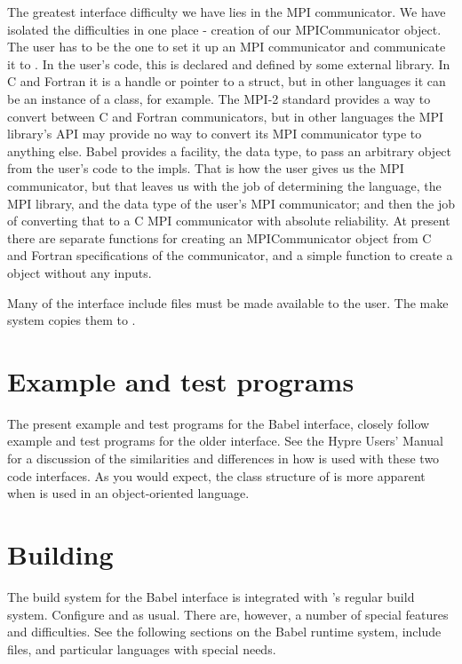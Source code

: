 The greatest interface difficulty we have lies in the MPI
communicator.  We have isolated the difficulties in one place -
creation of our MPICommunicator object.  The user has to be the one to
set it up an MPI communicator and communicate it to \hypre{}.  In the
user's code, this is declared and defined by some external library.
In C and Fortran it is a handle or pointer to a struct, but in other
languages it can be an instance of a class, for example.  The MPI-2
standard provides a way to convert between C and Fortran
communicators, but in other languages the MPI library's API may
provide no way to convert its MPI communicator type to anything else.
Babel provides a facility, the  data type, to pass an
arbitrary object from the user's code to the impls.  That is how the
user gives us the MPI communicator, but that leaves us with the job of
determining the language, the MPI library, and the data type of the
user's MPI communicator; and then the job of converting that to a C
MPI communicator with absolute reliability.  At present there are
separate functions for creating an MPICommunicator object from C and
Fortran specifications of the communicator, and a simple function to
create a  object without any inputs.

Many of the \hypre{} interface include files must be made available to
the user.  The make system copies them to .

\section{Example and test programs}

The present example and test programs for the Babel interface, closely
follow example and test programs for the older interface.  See the
Hypre Users' Manual for a discussion of the similarities and differences in
how \hypre{} is used with these two code interfaces.  As you would
expect, the class structure of \hypre{} is more apparent when \hypre{}
is used in an object-oriented language.

\section{Building}

The build system for the Babel interface is integrated with \hypre{}'s
regular build system.  Configure  and 
as usual.  There are, however, a number of special features and
difficulties.  See the following sections on the Babel runtime system,
include files, and particular languages with special needs.

